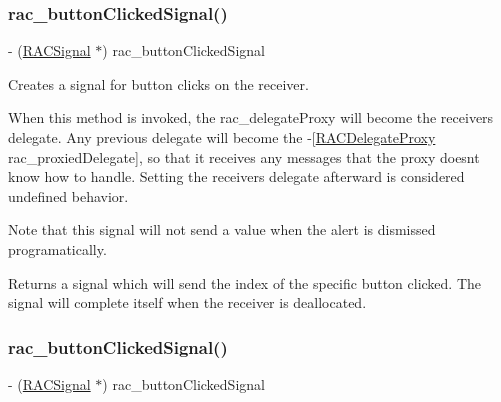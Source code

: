 \subsubsection{\texorpdfstring{rac\+\_\+button\+Clicked\+Signal()}{rac\_buttonClickedSignal()}\hspace{0.1cm}{\footnotesize\ttfamily [1/3]}}
{\footnotesize\ttfamily -\/ (\mbox{\hyperlink{interface_r_a_c_signal}{R\+A\+C\+Signal}} $\ast$) rac\+\_\+button\+Clicked\+Signal \begin{DoxyParamCaption}{ }\end{DoxyParamCaption}}

Creates a signal for button clicks on the receiver.

When this method is invoked, the {\ttfamily rac\+\_\+delegate\+Proxy} will become the receiver\textquotesingle{}s delegate. Any previous delegate will become the -\/\mbox{[}\mbox{\hyperlink{interface_r_a_c_delegate_proxy}{R\+A\+C\+Delegate\+Proxy}} rac\+\_\+proxied\+Delegate\mbox{]}, so that it receives any messages that the proxy doesn\textquotesingle{}t know how to handle. Setting the receiver\textquotesingle{}s {\ttfamily delegate} afterward is considered undefined behavior.

Note that this signal will not send a value when the alert is dismissed programatically.

Returns a signal which will send the index of the specific button clicked. The signal will complete itself when the receiver is deallocated. \mbox{\label{category_u_i_alert_view_07_r_a_c_signal_support_08_afc61c8b02f0adc4622f827eef4a8c2af}} 
\subsubsection{\texorpdfstring{rac\+\_\+button\+Clicked\+Signal()}{rac\_buttonClickedSignal()}\hspace{0.1cm}{\footnotesize\ttfamily [2/3]}}
{\footnotesize\ttfamily -\/ (\mbox{\hyperlink{interface_r_a_c_signal}{R\+A\+C\+Signal}} $\ast$) rac\+\_\+button\+Clicked\+Signal \begin{DoxyParamCaption}{ }\end{DoxyParamCaption}}

